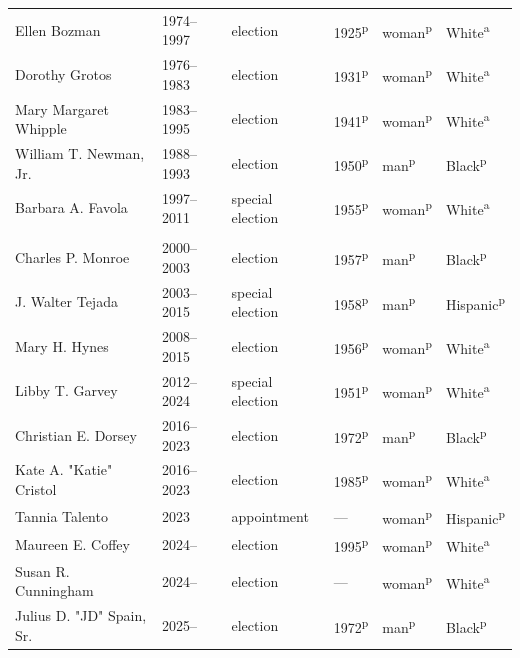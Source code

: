 \begin{table}[t]
\begin{tabular}{Q}
Ellen Bozman & 1974--1997 & election & 1925\textsuperscript{p} & woman\textsuperscript{p} & White\textsuperscript{a} \\
Dorothy Grotos & 1976--1983 & election & 1931\textsuperscript{p} & woman\textsuperscript{p} & White\textsuperscript{a} \\
Mary Margaret Whipple & 1983--1995 & election & 1941\textsuperscript{p} & woman\textsuperscript{p} & White\textsuperscript{a} \\
William T. Newman, Jr. & 1988--1993 & election & 1950\textsuperscript{p} & man\textsuperscript{p} & Black\textsuperscript{p} \\
Barbara A. Favola & 1997--2011 & special election & 1955\textsuperscript{p} & woman\textsuperscript{p} & White\textsuperscript{a} \\
\addlinespace[1.4ex]
 \\*
Charles P. Monroe & 2000--2003 & election & 1957\textsuperscript{p} & man\textsuperscript{p} & Black\textsuperscript{p} \\
J. Walter Tejada & 2003--2015 & special election & 1958\textsuperscript{p} & man\textsuperscript{p} & Hispanic\textsuperscript{p} \\
Mary H. Hynes & 2008--2015 & election & 1956\textsuperscript{p} & woman\textsuperscript{p} & White\textsuperscript{a} \\
Libby T. Garvey & 2012--2024 & special election & 1951\textsuperscript{p} & woman\textsuperscript{p} & White\textsuperscript{a} \\
Christian E. Dorsey & 2016--2023 & election & 1972\textsuperscript{p} & man\textsuperscript{p} & Black\textsuperscript{p} \\
Kate A. "Katie" Cristol & 2016--2023 & election & 1985\textsuperscript{p} & woman\textsuperscript{p} & White\textsuperscript{a} \\
Tannia Talento & 2023 & appointment & --- & woman\textsuperscript{p} & Hispanic\textsuperscript{p} \\
Maureen E. Coffey & 2024-- & election & 1995\textsuperscript{p} & woman\textsuperscript{p} & White\textsuperscript{a} \\
Susan R. Cunningham & 2024-- & election & --- & woman\textsuperscript{p} & White\textsuperscript{a} \\
Julius D. "JD" Spain, Sr. & 2025-- & election & 1972\textsuperscript{p} & man\textsuperscript{p} & Black\textsuperscript{p} \\
\bottomrule
\end{tabular}\endgroup
\par\smallskip
{}
\end{table}
